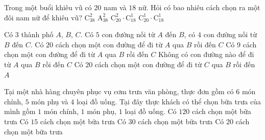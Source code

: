 \begin{ex}%
	Trong một buổi khiêu vũ có $20$ nam và $18$ nữ. Hỏi có bao nhiêu cách chọn ra một đôi nam nữ để khiêu vũ? 
	 \choice
		 {$\mathrm{C}_{38}^2$}
		 {$\mathrm{A}_{38}^2$}
		{$\mathrm{C}_{20}^2\cdot \mathrm{C}_{18}^1$} 
		 {\True $\mathrm{C}_{20}^1\cdot \mathrm{C}_{18}^1$}
\end{ex}


\begin{ex}%
	Có $3$ thành phố $A$,  $B$, $C$. Có $5$ con đường nối từ $A$ đến $B$, có $4$ con đường nối từ $B$ đến $C$.
	\choiceTF 
		{\True Có  $20$ cách chọn một con đường để đi từ $A$ qua $B$ rồi đến $C$}
		{Có $9$ cách chọn một  con đường để đi từ $A$ qua $B$ rồi đến $C$}
		{Không có con đường  nào để đi từ $A$ qua $B$ rồi đến $C$}
		{\True Có $20$ cách chọn một  con đường để đi từ $C$ qua $B$ rồi đến $A$}
\end{ex}

\begin{ex}%
	Tại một nhà hàng chuyên phục vụ cơm trưa văn phòng, thực đơn gồm có $6$ món chính, $5$ món phụ và $4$ loại đồ uống. Tại đây thực khách có thể  chọn bữa trưa của mình gồm $1$ món chính, $1$ món phụ, $1$ loại đồ uống.
	\choiceTF 
		{\True  Có $120$ cách chọn một bữa trưa}
		{Có $15$ cách chọn một bữa  trưa}
		{Có $30$ cách chọn một bữa trưa} 
		{Có $20$  cách chọn một bữa trưa}
\end{ex}

